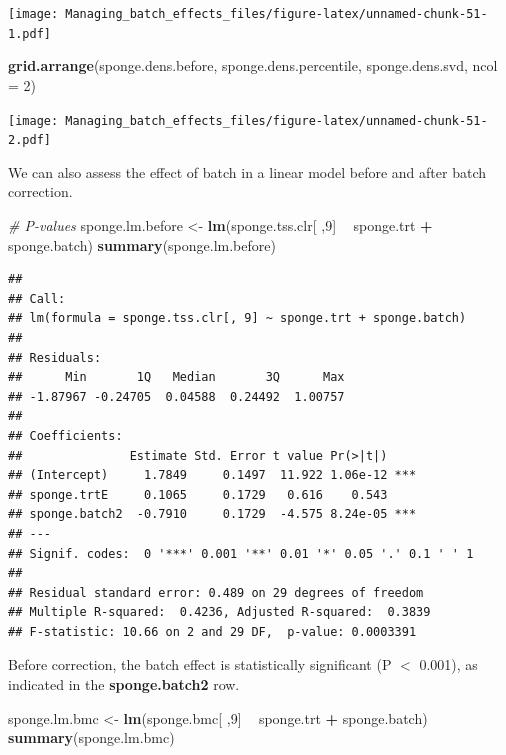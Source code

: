 \documentclass[]{book}
\newenvironment{Shaded}{\begin{snugshade}}{\end{snugshade}}
\newcommand{\KeywordTok}[1]{\textcolor[rgb]{0.13,0.29,0.53}{\textbf{#1}}}
\newcommand{\DataTypeTok}[1]{\textcolor[rgb]{0.13,0.29,0.53}{#1}}
\newcommand{\DecValTok}[1]{\textcolor[rgb]{0.00,0.00,0.81}{#1}}
\newcommand{\StringTok}[1]{\textcolor[rgb]{0.31,0.60,0.02}{#1}}
\newcommand{\CommentTok}[1]{\textcolor[rgb]{0.56,0.35,0.01}{\textit{#1}}}
\newcommand{\OperatorTok}[1]{\textcolor[rgb]{0.81,0.36,0.00}{\textbf{#1}}}
\newcommand{\NormalTok}[1]{#1}
\begin{document}
\texttt{[image: Managing\_batch\_effects\_files/figure-latex/unnamed-chunk-51-1.pdf]}

\begin{Shaded}
\begin{Highlighting}[]
\KeywordTok{grid.arrange}\NormalTok{(sponge.dens.before, sponge.dens.percentile, }
\NormalTok{             sponge.dens.svd, }\DataTypeTok{ncol =} \DecValTok{2}\NormalTok{)}
\end{Highlighting}
\end{Shaded}

\texttt{[image: Managing\_batch\_effects\_files/figure-latex/unnamed-chunk-51-2.pdf]}

We can also assess the effect of batch in a linear model before and
after batch correction.

\begin{Shaded}
\begin{Highlighting}[]
\CommentTok{# P-values}
\NormalTok{sponge.lm.before <-}\StringTok{ }\KeywordTok{lm}\NormalTok{(sponge.tss.clr[ ,}\DecValTok{9}\NormalTok{] }\OperatorTok{~}\StringTok{ }\NormalTok{sponge.trt }\OperatorTok{+}\StringTok{ }\NormalTok{sponge.batch)}
\KeywordTok{summary}\NormalTok{(sponge.lm.before)}
\end{Highlighting}
\end{Shaded}

\begin{verbatim}
## 
## Call:
## lm(formula = sponge.tss.clr[, 9] ~ sponge.trt + sponge.batch)
## 
## Residuals:
##      Min       1Q   Median       3Q      Max 
## -1.87967 -0.24705  0.04588  0.24492  1.00757 
## 
## Coefficients:
##               Estimate Std. Error t value Pr(>|t|)    
## (Intercept)     1.7849     0.1497  11.922 1.06e-12 ***
## sponge.trtE     0.1065     0.1729   0.616    0.543    
## sponge.batch2  -0.7910     0.1729  -4.575 8.24e-05 ***
## ---
## Signif. codes:  0 '***' 0.001 '**' 0.01 '*' 0.05 '.' 0.1 ' ' 1
## 
## Residual standard error: 0.489 on 29 degrees of freedom
## Multiple R-squared:  0.4236, Adjusted R-squared:  0.3839 
## F-statistic: 10.66 on 2 and 29 DF,  p-value: 0.0003391
\end{verbatim}

Before correction, the batch effect is statistically significant (P
\(<\) 0.001), as indicated in the \textbf{sponge.batch2} row.

\begin{Shaded}
\begin{Highlighting}[]
\NormalTok{sponge.lm.bmc <-}\StringTok{ }\KeywordTok{lm}\NormalTok{(sponge.bmc[ ,}\DecValTok{9}\NormalTok{] }\OperatorTok{~}\StringTok{ }\NormalTok{sponge.trt }\OperatorTok{+}\StringTok{ }\NormalTok{sponge.batch)}
\KeywordTok{summary}\NormalTok{(sponge.lm.bmc)}
\end{Highlighting}
\end{Shaded}
\end{document}
